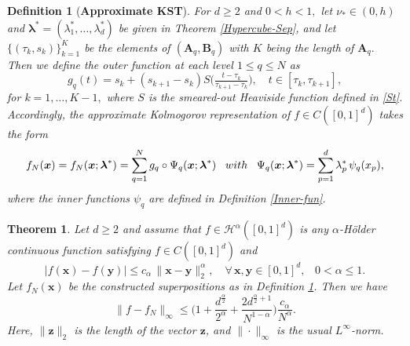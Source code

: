 \documentclass[10pt,a4paper]{amsart}
\newtheorem{definition}{Definition}
\newtheorem{theorem}{Theorem}
\newcommand{\bs}[1]{\boldsymbol{#1}}
\begin{document}
\begin{definition}[{\bf  Approximate KST}]\label{Defn:Outer01} {\em  For $d\ge 2$ and   $0<h<1,$
let $\nu_*\in (0,h)$ and $\bs \lambda^*=(\lambda_1^*, \ldots, \lambda_d^*)$  be  given in Theorem \ref{Hypercube-Sep}, and let $\{(\tau_k, s_k)\}_{k=1}^{K}$ be the elements of 
$(\bs A_q, \bs B_q)$ with $K$ being the length of $\bs A_q.$ Then we define the outer function at each level $1\le q\le N$ as 
\begin{equation}\label{qj2g01-A}
  g_q(t)=s_k +(s_{k+1}-s_k) S\big(\tfrac{t-\tau_k}{\tau_{k+1}-\tau_k}\big), \quad t\in  [\tau_k, \tau_{k+1}],
\end{equation}
for $k=1,\ldots, K-1,$ where $S$ is the smeared-out Heaviside function  defined in \eqref{St}. Accordingly, the approximate Kolmogorov  representation of $f\in C([0,1]^d)$  takes the form 
\begin{equation}\label{0fx-KA-form-B00}
      f_N(\bs x)=f_N(\bs x; \bs \lambda^*)=\sum_{q=1}^{N} g_q\circ\Psi_q(\bs x;\bs \lambda^*)\;\;\;
      {\rm with}
      \;\;\; \Psi_q(\bs x;\bs \lambda^*)=\sum_{p=1}^d \lambda_p^*\, \psi_q(x_p),
\end{equation}
where the inner functions $\psi_q$ are defined in Definition \ref{Inner-fun}.
}
\end{definition}

\begin{theorem}\label{MainResult} Let $d\ge 2$ and 
assume that  $f\in {\mathcal H}^\alpha([0,1]^d)$ is any $\alpha$-H\"older continuous function satisfying 
$f\in C([0,1]^d)$ and 
\begin{equation}\label{alpha-cond}
    |f(\bs x)-f(\bs y)|\le c_{\alpha}\, \|\bs x-\bs y\|_2^\alpha, \quad \forall\, \bs x,\bs y \in [0,1]^d,\;\;\; 0<\alpha\le 1.
\end{equation}
 Let $f_N(\bs x)$ be the constructed superpositions as in Definition \ref{Defn:Outer01}. Then we have 
\begin{equation}\label{approximA}
\|f-f_N\|_\infty \le  \Big(1+\frac{d^{\frac{\alpha}{2}}}{2^\alpha} +\frac{2 d^{\frac \alpha 2+1 }}{N^{1-\alpha}}\Big)\frac {c_{\alpha}} {N^{\alpha}}.
\end{equation}
Here, $\|\bs z\|_2$ is the length of the vector $\bs z$, and $\|\cdot\|_\infty$ is the usual $L^\infty$-norm.  
\end{theorem}
\end{document}
